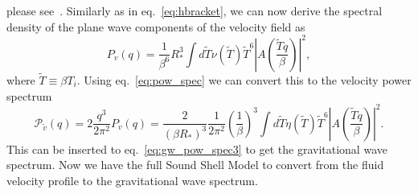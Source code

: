 please see~\cite[section 4.2]{hindmarsh_gw_pt_2019}.
Similarly as in eq.~\eqref{eq:hbracket}, we can now derive the spectral density of the plane wave components of the velocity field as
\cite[eq. 4.17]{hindmarsh_gw_pt_2019}
\begin{equation}
P_v(q) = \frac{1}{\beta^6}{R_*^3} \int d\tilde{T} \nu(\tilde{T}) \tilde{T}^6 |A(\frac{\tilde{T}q}{\beta})|^2,
\label{eq:spec_den_v}
\end{equation}
where $\tilde{T} \equiv \beta T_i$.
Using eq.~\eqref{eq:pow_spec} we can convert this to the velocity power spectrum
\cite[eq. 4.18]{hindmarsh_gw_pt_2019}
\begin{equation}
\mathcal{P}_{\tilde{v}}(q)
= 2 \frac{q^3}{2\pi^2} P_v(q)
= \frac{2}{(\beta R_*)^3} \frac{1}{2\pi^2} \left(\frac{1}{\beta}\right)^3
\int d \tilde{T} \eta(\tilde{T}) \tilde{T}^6 \left| A \left( \frac{\tilde{T} q}{\beta} \right) \right|^2.
\label{eq:pow_v}
\end{equation}
This can be inserted to eq.~\eqref{eq:gw_pow_spec3} to get the gravitational wave spectrum.
Now we have the full Sound Shell Model to convert from the fluid velocity profile to the gravitational wave spectrum.


